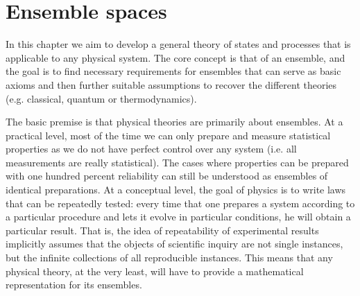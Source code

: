 
\def\>{\rangle}
\def\<{\langle}

\newcommand\mix{\mathrm{mix}}
\newcommand\component{\mathrm{comp}}
\newcommand\cospan{\mathrm{cospan}}
\newcommand\dist{\mathrm{dist}}
\newcommand\hull{\mathrm{hull}}
\newcommand\shull{\mathrm{shull}}
\newcommand\chull{\mathrm{chull}}
\newcommand\support{\mathrm{supp}}
\newcommand\capacity{\mathrm{scap}}
\newcommand\size{\mathrm{frac}}
\newcommand\fcap{\mathrm{fcap}}

\newcommand\vspan{\mathrm{span}}
\newcommand\cl{\mathrm{cl}}

\def\separate{\downmodels}
\def\nseparate{\ndownmodels}
\def\ortho{\perp}
\def\northo{\nperp}

%

\newcommand{\ens}[1][e] {\mathsf{#1}} %
\newcommand{\Ens}[1][E] {\mathcal{#1}} %

\newcommand{\titledbreak}[1]{
	\newpage
	\vspace{3em}  %
	\noindent
	\centerline{\huge\centering\textbf{#1}} %
	\par\nobreak
	\noindent\rule{\textwidth}{0.5pt}  %
}
\chapter{Ensemble spaces}

In this chapter we aim to develop a general theory of states and processes that is applicable to any physical system. The core concept is that of an ensemble, and the goal is to find necessary requirements for ensembles that can serve as basic axioms and then further suitable assumptions to recover the different theories (e.g. classical, quantum or thermodynamics).

The basic premise is that physical theories are primarily about ensembles. At a practical level, most of the time we can only prepare and measure statistical properties as we do not have perfect control over any system (i.e. all measurements are really statistical). The cases where properties can be prepared with one hundred percent reliability can still be understood as ensembles of identical preparations. At a conceptual level, the goal of physics is to write laws that can be repeatedly tested: every time that one prepares a system according to a particular procedure and lets it evolve in particular conditions, he will obtain a particular result. That is, the idea of repeatability of experimental results implicitly assumes that the objects of scientific inquiry are not single instances, but the infinite collections of all reproducible instances. This means that any physical theory, at the very least, will have to provide a mathematical representation for its ensembles.

